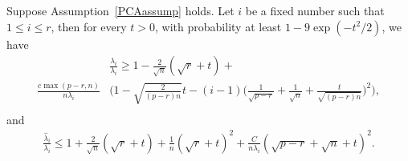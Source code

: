 \begin{theorem}
    Suppose Assumption~\ref{PCAassump} holds.
    Let $i$ be a fixed number such that $1 \leq i\leq r$, then for every $t>0$, with probability at least $1-9\exp(-t^2/2)$, we have
    \begin{equation*}
        \begin{split}
            &\frac{\hat{\lambda}_i}{\lambda_i}\geq 
        1-\frac{2}{\sqrt{n}}(\sqrt{r}+t)+\\
            \frac{c\max(p-r,n)}{n\lambda_i} &\Big( 1-\sqrt{\frac{2}{(p-r)n}}t-(i-1)\big(\frac{1}{\sqrt{p-r}}+\frac{1}{\sqrt{n}}+\frac{t}{\sqrt{(p-r)n}}\big)^2 \Big),\\
        \end{split}
    \end{equation*}
    and
    \begin{equation*}
        \begin{split}
            \frac{\hat{\lambda}_i}{\lambda_i}\leq 
        1+\frac{2}{\sqrt{n}}(\sqrt{r}+t)+\frac{1}{n}(\sqrt{r}+t)^2+
        \frac{C}{n\lambda_i} (\sqrt{p-r}+\sqrt{n}+t)^2.
        \end{split}
    \end{equation*}


\end{theorem}
